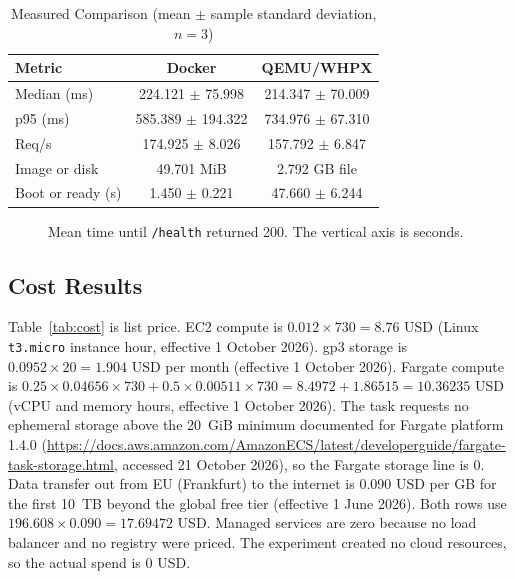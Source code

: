 \documentclass[conference,a4paper]{IEEEtran}
\begin{document}
\begin{table}[htbp]
	\caption{Measured Comparison (mean \(\pm\) sample standard deviation, \(n=3\))}
	\label{tab:results}
	\begin{center}
		\scriptsize
		\begin{tabular}{|l|c|c|}
			\hline
			\textbf{Metric} & \textbf{Docker} & \textbf{QEMU/WHPX} \\
			\hline
			Median (ms) & 224.121 \(\pm\) 75.998 & 214.347 \(\pm\) 70.009 \\
			\hline
			p95 (ms) & 585.389 \(\pm\) 194.322 & 734.976 \(\pm\) 67.310 \\
			\hline
			Req/s & 174.925 \(\pm\) 8.026 & 157.792 \(\pm\) 6.847 \\
			\hline
			Image or disk & 49.701 MiB & 2.792 GB file \\
			\hline
			Boot or ready (s) & 1.450 \(\pm\) 0.221 & 47.660 \(\pm\) 6.244 \\
			\hline
		\end{tabular}
	\end{center}
\end{table}

\begin{figure}[htbp]
	\centering
	\caption{Mean time until \texttt{/health} returned 200. The vertical axis is seconds.}
	\label{fig:results}
\end{figure}

\subsection{Cost Results}

Table~\ref{tab:cost} is list price. EC2 compute is \(0.012 \times 730 = 8.76\) USD (Linux \texttt{t3.micro} instance hour, effective 1 October 2026). gp3 storage is \(0.0952 \times 20 = 1.904\) USD per month (effective 1 October 2026). Fargate compute is \(0.25 \times 0.04656 \times 730 + 0.5 \times 0.00511 \times 730 = 8.4972 + 1.86515 = 10.36235\) USD (vCPU and memory hours, effective 1 October 2026). The task requests no ephemeral storage above the 20~GiB minimum documented for Fargate platform 1.4.0 (\url{https://docs.aws.amazon.com/AmazonECS/latest/developerguide/fargate-task-storage.html}, accessed 21 October 2026), so the Fargate storage line is 0. Data transfer out from EU (Frankfurt) to the internet is 0.090 USD per GB for the first 10~TB beyond the global free tier (effective 1 June 2026). Both rows use \(196.608 \times 0.090 = 17.69472\) USD. Managed services are zero because no load balancer and no registry were priced. The experiment created no cloud resources, so the actual spend is 0 USD.
\end{document}
